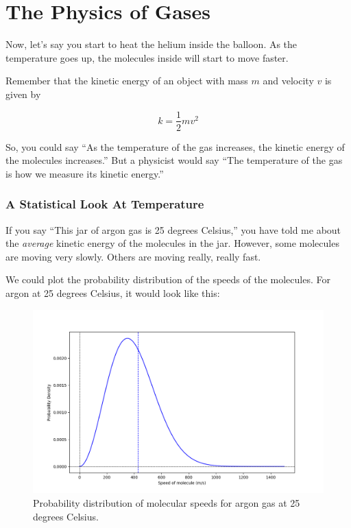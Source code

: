 \chapter{The Physics of Gases}


Now, let's say you start to heat the helium inside the balloon. As the temperature goes up, the molecules inside will start to move faster.

Remember that the kinetic energy of an object with mass $m$ and velocity $v$ is given by

$$k = \frac{1}{2} m v^2$$

So, you could say ``As the temperature of the gas increases, the kinetic energy of the molecules increases.''  But a physicist would say ``The temperature of the gas is how we measure its kinetic energy.''
\subsection{A Statistical Look At Temperature}

If you say ``This jar of argon gas is 25 degrees Celsius,'' you have told me about the \emph{average} kinetic energy of the molecules in the jar. 
However, some molecules are moving very slowly. Others are moving really, really fast. 

We could plot the probability distribution of the speeds of the molecules. For argon at 25 degrees Celsius, it would look like this:
\begin{figure}[htbp]
    \centering
    \includegraphics[width=\textwidth]{ar_plot.png}
    \caption{Probability distribution of molecular speeds for argon gas at 25 degrees Celsius.}
    \label{fig:argon_speed_distribution}
\end{figure}

